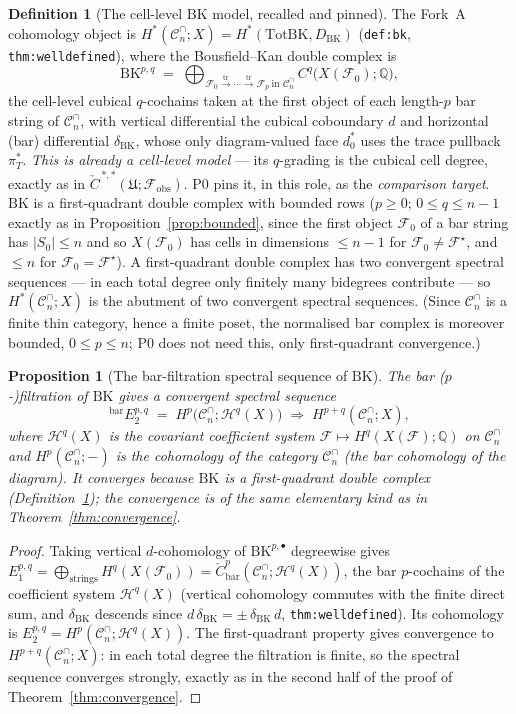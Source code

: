 \documentclass[11pt,oneside]{amsart}
\theoremstyle{plain}
\newtheorem{proposition}[theorem]{Proposition}
\theoremstyle{definition}
\newtheorem{definition}[theorem]{Definition}
\theoremstyle{remark}
\theoremstyle{honeststyle}
\newcommand{\F}{\mathcal{F}}
\newcommand{\Fstar}{\F^{\star}}
\newcommand{\Q}{\mathbb{Q}}
\newcommand{\Cn}{\mathcal{C}^{\cap}_n}
\newcommand{\tr}{\mathrm{tr}}
\newcommand{\BK}{\mathrm{BK}}
\newcommand{\Tot}{\mathrm{Tot}}
\newcommand{\fobs}{\mathcal{F}_{\mathrm{obs}}}
\newcommand{\Uf}{\mathfrak{U}}
\newcommand{\Ccheck}{\check{C}}
\begin{document}
\begin{definition}[The cell-level $\BK$ model, recalled and pinned]
\label{def:bkmodel}
The Fork~A cohomology object is $H^{*}(\Cn;X)=H^{*}(\Tot\BK,D_{\BK})$
(\texttt{def:bk}, \texttt{thm:welldefined}), where the
Bousfield--Kan double complex is
\[
  \BK^{p,q}\;=\;
  \bigoplus_{\F_{0}\xrightarrow{\,\tr\,}\cdots\xrightarrow{\,\tr\,}\F_{p}
  \ \text{in }\Cn}C^{q}\bigl(X(\F_{0});\Q\bigr),
\]
the cell-level cubical $q$-cochains taken at the first object of each
length-$p$ bar string of $\Cn$, with vertical differential the
cubical coboundary $d$ and horizontal (bar) differential
$\delta_{\BK}$, whose only diagram-valued face $d_{0}^{*}$ uses the
trace pullback $\pi_{T}^{*}$. \emph{This is already a cell-level
model} --- its $q$-grading is the cubical cell degree, exactly as in
$\Ccheck^{\,*,*}(\Uf;\fobs)$. P0 pins it, in this role, as the
\emph{comparison target}. $\BK$ is a first-quadrant double complex
with bounded rows ($p\ge0$; $0\le q\le n-1$ exactly as in
Proposition~\ref{prop:bounded}, since the first object $\F_{0}$ of a
bar string has $|S_{0}|\le n$ and so $X(\F_{0})$ has cells in
dimensions $\le n-1$ for $\F_{0}\neq\Fstar$, and $\le n$ for
$\F_{0}=\Fstar$). A first-quadrant double complex has two convergent
spectral sequences --- in each total degree only finitely many
bidegrees contribute --- so $H^{*}(\Cn;X)$ is the abutment of two
convergent spectral sequences. (Since $\Cn$ is a finite thin category,
hence a finite poset, the normalised bar complex is moreover bounded,
$0\le p\le n$; P0 does not need this, only first-quadrant
convergence.)
\end{definition}

\begin{proposition}[The bar-filtration spectral sequence of $\BK$]
\label{prop:bkss}
The bar ($p$-)filtration of $\BK$ gives a convergent spectral
sequence
\[
  {}^{\mathrm{bar}}E_{2}^{p,q}\;=\;H^{p}\bigl(\Cn;\mathcal
  H^{q}(X)\bigr)\;\Longrightarrow\;H^{p+q}(\Cn;X),
\]
where $\mathcal H^{q}(X)$ is the covariant coefficient system
$\F\mapsto H^{q}(X(\F);\Q)$ on $\Cn$ and $H^{p}(\Cn;-)$ is the
cohomology of the category $\Cn$ (the bar cohomology of the diagram).
It converges because $\BK$ is a first-quadrant double complex
(Definition~\ref{def:bkmodel}); the convergence is of the same
elementary kind as in Theorem~\ref{thm:convergence}.
\end{proposition}

\begin{proof}
Taking vertical $d$-cohomology of $\BK^{p,\bullet}$ degreewise gives
$E_{1}^{p,q}=\bigoplus_{\text{strings}}H^{q}(X(\F_{0}))=\check
C^{p}_{\mathrm{bar}}(\Cn;\mathcal H^{q}(X))$, the bar $p$-cochains of
the coefficient system $\mathcal H^{q}(X)$ (vertical cohomology
commutes with the finite direct sum, and $\delta_{\BK}$ descends since
$d\,\delta_{\BK}=\pm\,\delta_{\BK}\,d$, \texttt{thm:welldefined}). Its
cohomology is $E_{2}^{p,q}=H^{p}(\Cn;\mathcal H^{q}(X))$. The
first-quadrant property gives convergence to $H^{p+q}(\Cn;X)$: in each
total degree the filtration is finite, so the spectral sequence
converges strongly, exactly as in the second half of the proof of
Theorem~\ref{thm:convergence}.
\end{proof}
\end{document}
